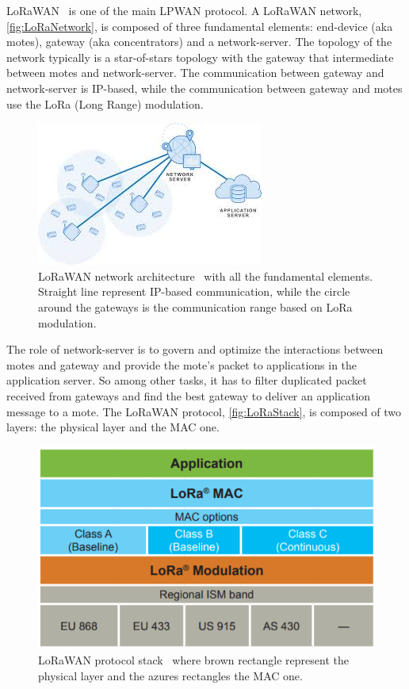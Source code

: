 LoRaWAN~\cite{loraalliancetechnicalcommittee2020} is one of the main LPWAN protocol.
A LoRaWAN network, \autoref{fig:LoRaNetwork}, is composed of three fundamental elements: end-device (aka motes), gateway (aka concentrators) and a network-server. 
% 
The topology of the network typically is a star-of-stars topology with the gateway that intermediate between motes and network-server.
% 
The communication between gateway and network-server is IP-based, while the communication between gateway and motes use the LoRa (Long Range) modulation.

\begin{figure}[h]
    \centering
    \includegraphics{figures/lora_architecture2.png}
    \caption[LoRaWAN network architecture]{LoRaWAN network architecture~\cite{muntasirjoarder2020} with all the fundamental elements. Straight line represent IP-based communication, while the circle around the gateways is the communication range based on LoRa modulation.}
    \label{fig:LoRaNetwork}
\end{figure}

The role of network-server is to govern and optimize the interactions between motes and gateway and provide the mote's packet to applications in the application server.
% 
So among other tasks, it has to filter duplicated packet received from gateways and find the best gateway to deliver an application message to a mote.
% 
The LoRaWAN protocol, \autoref{fig:LoRaStack}, is composed of two layers: the  physical layer and the MAC one.

\begin{figure}[h]
    \centering
    \includegraphics{figures/loraStack.png}
    \caption[LoRaWAN protocol stack]{LoRaWAN protocol stack~\cite{loraalliance2020} where brown rectangle represent the physical layer and the azures rectangles the MAC one.}
    \label{fig:LoRaStack}
\end{figure}

